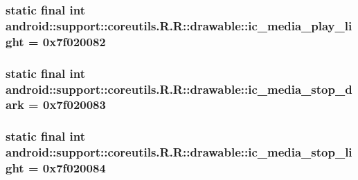 \hypertarget{classandroid_1_1support_1_1coreutils_1_1_r_1_1drawable_8fb92aa2afb251e21baaf2cc35459c5e}{
\subsubsection[{ic\_\-media\_\-play\_\-light}]{\setlength{\rightskip}{0pt plus 5cm}static final int android::support::coreutils.R.R::drawable::ic\_\-media\_\-play\_\-light = 0x7f020082}}
\label{classandroid_1_1support_1_1coreutils_1_1_r_1_1drawable_8fb92aa2afb251e21baaf2cc35459c5e}


\hypertarget{classandroid_1_1support_1_1coreutils_1_1_r_1_1drawable_752a41edcfcdbde3c807ac36eb25b9d2}{
\subsubsection[{ic\_\-media\_\-stop\_\-dark}]{\setlength{\rightskip}{0pt plus 5cm}static final int android::support::coreutils.R.R::drawable::ic\_\-media\_\-stop\_\-dark = 0x7f020083}}
\label{classandroid_1_1support_1_1coreutils_1_1_r_1_1drawable_752a41edcfcdbde3c807ac36eb25b9d2}


\hypertarget{classandroid_1_1support_1_1coreutils_1_1_r_1_1drawable_8f1b861a1792134396fb1496d7e78293}{
\subsubsection[{ic\_\-media\_\-stop\_\-light}]{\setlength{\rightskip}{0pt plus 5cm}static final int android::support::coreutils.R.R::drawable::ic\_\-media\_\-stop\_\-light = 0x7f020084}}
\label{classandroid_1_1support_1_1coreutils_1_1_r_1_1drawable_8f1b861a1792134396fb1496d7e78293}



